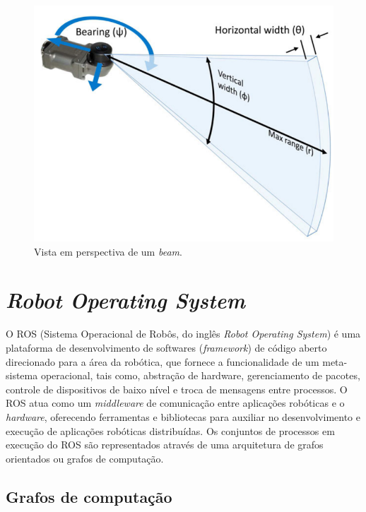 \begin{figure}[H]
    \centering
    \includegraphics[scale=0.3]{dados/figuras/beam.png}
    \caption{Vista em perspectiva de um \textit{beam}.}
    \vspace{-0.8em}
    \label{fig:beam}
\end{figure}


\section{\textit{Robot Operating System}}
\label{sec:ros}

O ROS (Sistema Operacional de Robôs, do inglês \textit{Robot Operating System}) é uma plataforma de desenvolvimento de softwares (\textit{framework}) de código aberto direcionado para a área da robótica, que fornece a funcionalidade de um meta-sistema operacional, tais como, abstração de hardware, gerenciamento de pacotes, controle de dispositivos de baixo nível e troca de mensagens entre processos. 
O ROS atua como um \textit{middleware} de comunicação entre aplicações robóticas e o \textit{hardware}, oferecendo ferramentas e bibliotecas para auxiliar no desenvolvimento e execução de aplicações robóticas distribuídas. Os conjuntos de processos em execução do ROS são representados através de uma arquitetura de grafos orientados ou grafos de computação.

\subsection{Grafos de computação}

